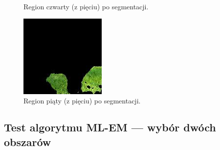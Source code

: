 \documentclass[10pt]{llncs}
\begin{document}
\begin{figure}[!htb]
  \caption{Region czwarty (z pięciu) po segmentacji.}\label{fig:11}
\endminipage\hfill
{}
  \includegraphics[width=\linewidth]{img/images_k5_4.jpg}
  \caption{Region piąty (z pięciu) po segmentacji.}\label{fig:12}
\endminipage
\end{figure}

\subsection{Test algorytmu ML-EM --- wybór dwóch obszarów}
\end{document}
